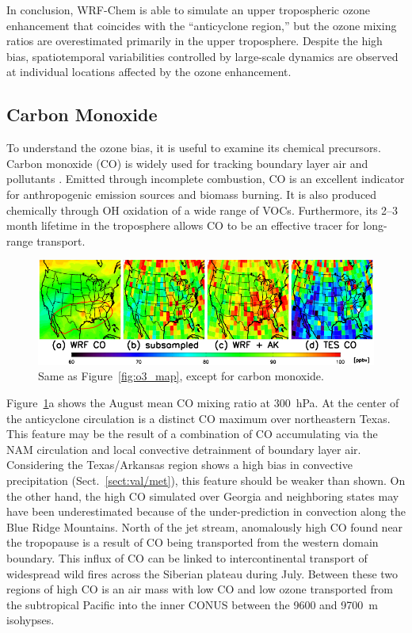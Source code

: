 In conclusion, WRF-Chem is able to simulate an upper tropospheric ozone enhancement
that coincides with the ``anticyclone region,'' but the ozone mixing ratios
are overestimated primarily in the upper troposphere. Despite the high bias,
spatiotemporal variabilities controlled by large-scale dynamics are observed at individual
locations affected by the ozone enhancement.

\subsection{Carbon Monoxide}\label{sect:val/co}

To understand the ozone bias, it is useful to examine its chemical precursors. Carbon
monoxide (CO) is widely used for tracking boundary layer air and pollutants
\citep[e.g.][]{Pan:2007sw,Weinstock:2007yj}. Emitted through incomplete
combustion, CO  is an excellent indicator for anthropogenic emission sources and
biomass burning. It is also produced chemically through OH oxidation of a wide range
of VOCs. Furthermore, its 2--3 month lifetime in the troposphere allows CO to be an
effective tracer for long-range transport.

 \begin{figure}
 \noindent\includegraphics[width=40pc]{Figures/co/tes08_co.png}
 \caption[August mean CO at 300~hPa]{Same as Figure~\ref{fig:o3_map}, except for carbon monoxide.}
 \label{fig:co_map}
 \end{figure}

Figure~\ref{fig:co_map}a shows the August mean CO mixing ratio at 300~hPa. At the
center of the anticyclone circulation is a distinct CO maximum over northeastern Texas. This
feature may be the result of a combination of CO accumulating via the NAM circulation
and local convective detrainment of boundary layer air. Considering the Texas/Arkansas region
shows a high bias in convective precipitation (Sect.~\ref{sect:val/met}), this feature
should be weaker than shown. On the other hand, the high CO simulated over
Georgia and neighboring states may have been underestimated because of the
under-prediction in convection along the Blue Ridge Mountains. North of the
jet stream, anomalously high CO found near the tropopause is a result of CO being transported from the
western domain boundary. This influx of CO can be linked to intercontinental transport
of widespread wild fires across the Siberian plateau during July. Between these two regions
of high CO is an air mass with low CO and low ozone transported from the
subtropical Pacific into the inner CONUS between the 9600 and 9700~m isohypses.

